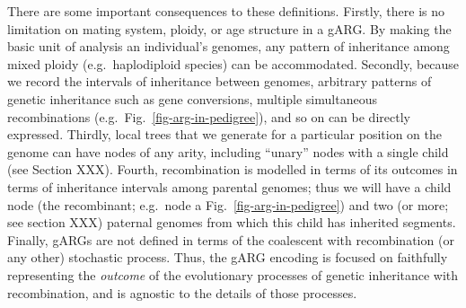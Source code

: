 \documentclass{article}
\newcommand{\noderef}[1]{\textsf{#1}}
\begin{document}
There are some important consequences to these definitions.
Firstly, there is
no limitation on mating system, ploidy, or age structure in a gARG.
By making the
basic unit of analysis an individual's genomes,
any pattern of inheritance among mixed ploidy (e.g.\ haplodiploid
species) can be accommodated.
Secondly, because we record the intervals of inheritance
between genomes,
arbitrary patterns of genetic inheritance such as
gene conversions,
multiple simultaneous recombinations
(e.g.\ Fig.~\ref{fig-arg-in-pedigree}),
and so on can be directly expressed.
Thirdly, local trees that we generate for a particular position on the
genome can have nodes of any arity, including ``unary''
nodes with a single child (see Section XXX).
Fourth, recombination is modelled in terms of
its outcomes in terms of inheritance intervals among parental genomes;
thus we will have a child node (the recombinant; e.g.\ node \noderef{a}
Fig.~\ref{fig-arg-in-pedigree}) and two (or more; see section XXX)
paternal genomes from which this child has inherited segments.
Finally, gARGs are not defined in terms of the
coalescent with recombination (or any other) stochastic process.
Thus, the gARG encoding is focused on faithfully representing the
\emph{outcome} of the evolutionary processes of genetic inheritance
with recombination,
and is agnostic to the details of those processes.
\end{document}
